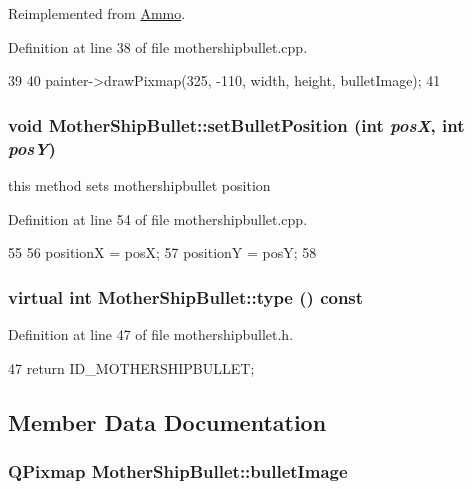 Reimplemented from \hyperlink{class_ammo_a3f4c8157fab369e46bac4bb88348d8c1}{Ammo}.

Definition at line 38 of file mothershipbullet.cpp.


\begin{DoxyCode}
39 {
40     painter->drawPixmap(325, -110, width, height, bulletImage);
41 }
\end{DoxyCode}
\hypertarget{class_mother_ship_bullet_ac2165443de035034133f7f215939ef92}{
\subsubsection[{setBulletPosition}]{\setlength{\rightskip}{0pt plus 5cm}void MotherShipBullet::setBulletPosition (int {\em posX}, \/  int {\em posY})}}
\label{class_mother_ship_bullet_ac2165443de035034133f7f215939ef92}
this method sets mothershipbullet position 

Definition at line 54 of file mothershipbullet.cpp.


\begin{DoxyCode}
55 {
56     positionX = posX;
57     positionY = posY;
58 }
\end{DoxyCode}
\hypertarget{class_mother_ship_bullet_a7042b4539bd9465cf1cb9e5b9a56ddce}{
\subsubsection[{type}]{\setlength{\rightskip}{0pt plus 5cm}virtual int MotherShipBullet::type () const}}
\label{class_mother_ship_bullet_a7042b4539bd9465cf1cb9e5b9a56ddce}


Definition at line 47 of file mothershipbullet.h.


\begin{DoxyCode}
47 {return ID_MOTHERSHIPBULLET; }
\end{DoxyCode}


\subsection{Member Data Documentation}
\hypertarget{class_mother_ship_bullet_a9c582124220ad9aa63f7dbbf690a0743}{
\subsubsection[{bulletImage}]{\setlength{\rightskip}{0pt plus 5cm}QPixmap {\bf MotherShipBullet::bulletImage}}}
\label{class_mother_ship_bullet_a9c582124220ad9aa63f7dbbf690a0743}


